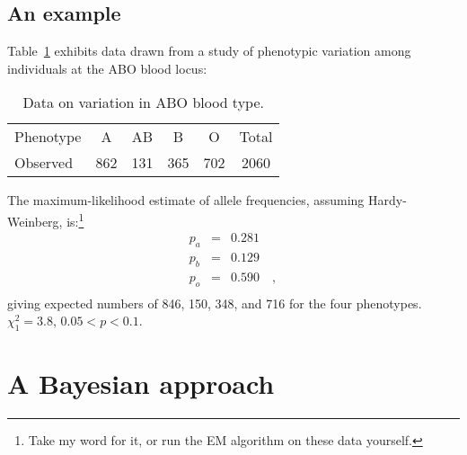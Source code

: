 \subsection*{An example}

Table~\ref{table:abo-data} exhibits data drawn from a study of
phenotypic variation among individuals at the ABO blood locus:

\begin{table}
\begin{center}
\begin{tabular}{lccccc}
Phenotype &   A &  AB &   B &   O & Total \\
Observed  & 862 & 131 & 365 & 702 & 2060
\end{tabular}
\end{center}
\caption{Data on variation in ABO blood type.}\label{table:abo-data}
\end{table}
The maximum-likelihood estimate of allele frequencies,
assuming Hardy-Weinberg, is:\footnote{Take my word for it, or run the
  EM algorithm on these data yourself.}
\begin{eqnarray*}
p_a &=& 0.281 \\
p_b &=& 0.129 \\
p_o &=& 0.590 \quad , \\
\end{eqnarray*}
giving expected numbers of 846, 150, 348, and 716 for the
four phenotypes. $\chi^2_1 = 3.8$, $0.05 < p < 0.1$.

\section*{A Bayesian approach}

